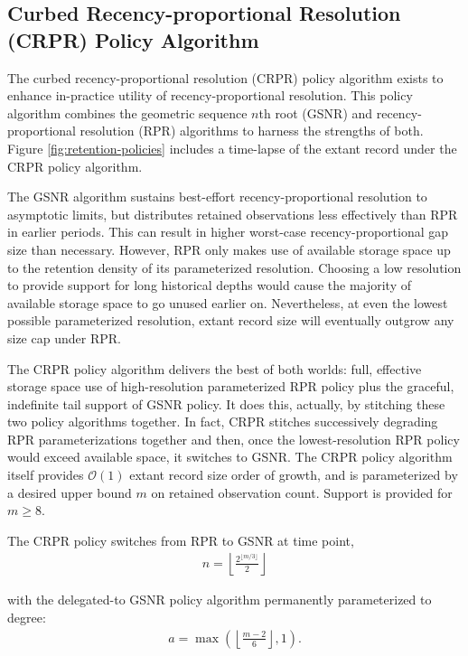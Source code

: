 \subsection{Curbed Recency-proportional Resolution (CRPR) Policy Algorithm}
\label{sec:curbed-recency-proportional-resolution-algo}

The curbed recency-proportional resolution (CRPR) policy algorithm exists to enhance in-practice utility of recency-proportional resolution.
This policy algorithm combines the geometric sequence $n$th root (GSNR) and recency-proportional resolution (RPR) algorithms to harness the strengths of both.
Figure \ref{fig:retention-policies} includes a time-lapse of the extant record under the CRPR policy algorithm.

The GSNR algorithm sustains best-effort recency-proportional resolution to asymptotic limits, but distributes retained observations less effectively than RPR in earlier periods.
This can result in higher worst-case recency-proportional gap size than necessary.
However, RPR only makes use of available storage space up to the retention density of its parameterized resolution.
Choosing a low resolution to provide support for long historical depths would cause the majority of available storage space to go unused earlier on.
Nevertheless, at even the lowest possible parameterized resolution, extant record size will eventually outgrow any size cap under RPR.

The CRPR policy algorithm delivers the best of both worlds: full, effective storage space use of high-resolution parameterized RPR policy plus the graceful, indefinite tail support of GSNR policy.
It does this, actually, by stitching these two policy algorithms together.
In fact, CRPR stitches successively degrading RPR parameterizations together and then, once the lowest-resolution RPR policy would exceed available space, it switches to GSNR.
The CRPR policy algorithm itself provides $\mathcal{O}(1)$ extant record size order of growth, and is parameterized by a desired upper bound $m$ on retained observation count.
Support is provided for $m \geq 8$.

The CRPR policy switches from RPR to GSNR at time point,
\begin{align*}
n = \left\lfloor \frac{2^{\lfloor m/3 \rfloor}}{2} \right\rfloor
\end{align*}

with the delegated-to GSNR policy algorithm permanently parameterized to degree:
\begin{align*}
a = \max \left(
  \left\lfloor \frac{m - 2}{6} \right\rfloor,
  1
\right).
\end{align*}

